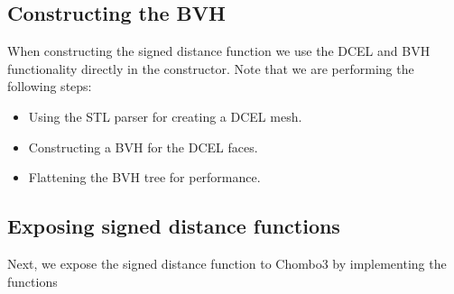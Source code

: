\documentclass[letterpaper,10pt,english]{sphinxmanual}
\begin{document}
\subsection{Constructing the BVH}
\label{\detokenize{Example_Chombo3:constructing-the-bvh}}
\sphinxAtStartPar
When constructing the signed distance function we use the DCEL and BVH functionality directly in the constructor.
Note that we are performing the following steps:
\begin{itemize}
\item {} 
\sphinxAtStartPar
Using the STL parser for creating a DCEL mesh.

\item {} 
\sphinxAtStartPar
Constructing a BVH for the DCEL faces.

\item {} 
\sphinxAtStartPar
Flattening the BVH tree for performance.

\end{itemize}


\subsection{Exposing signed distance functions}
\label{\detokenize{Example_Chombo3:exposing-signed-distance-functions}}
\sphinxAtStartPar
Next, we expose the signed distance function to Chombo3 by implementing the functions

\begin{sphinxVerbatim}[commandchars=\\\{\}]
     
   \PYG{p}{[}\PYG{p}{]} \PYG{p}{[}\PYG{p}{]} 
   \PYG{p}{[}\PYG{p}{]} \PYG{p}{[}\PYG{p}{]} \PYG{p}{[}\PYG{p}{]}

   
\end{sphinxVerbatim}
\end{document}
